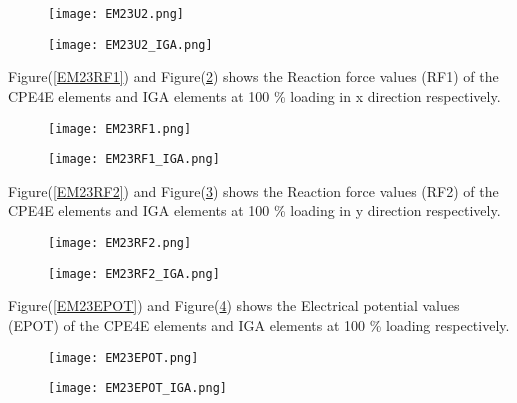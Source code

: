 \documentclass[11pt]{article}
\begin{document}
\begin{figure}[H]
	\centering
	\begin{minipage}{.5\textwidth}
		\centering
		\texttt{[image: EM23U2.png]}
		\label{EM23U2}
	\end{minipage}%
	\begin{minipage}{.5\textwidth}
		\centering
		\texttt{[image: EM23U2\_IGA.png]}
		\label{EM23U2_IGA}
	\end{minipage}
\end{figure}
Figure(\ref{EM23RF1}) and Figure(\ref{EM23RF1_IGA}) shows the Reaction force values (RF1) of the CPE4E elements and IGA elements at 100 \% loading in x direction respectively. \\
\begin{figure}[H]
	\centering
	\begin{minipage}{.5\textwidth}
		\centering
		\texttt{[image: EM23RF1.png]}
		\label{EM23RF1}
	\end{minipage}%
	\begin{minipage}{.5\textwidth}
		\centering
		\texttt{[image: EM23RF1\_IGA.png]}
		\label{EM23RF1_IGA}
	\end{minipage}
\end{figure}
Figure(\ref{EM23RF2}) and Figure(\ref{EM23RF2_IGA}) shows the Reaction force values (RF2) of the CPE4E elements and IGA elements at 100 \% loading in y direction respectively. \\
\begin{figure}[H]
	\centering
	\begin{minipage}{.5\textwidth}
		\centering
		\texttt{[image: EM23RF2.png]}
		\label{EM23RF2}
	\end{minipage}%
	\begin{minipage}{.5\textwidth}
		\centering
		\texttt{[image: EM23RF2\_IGA.png]}
		\label{EM23RF2_IGA}
	\end{minipage}
\end{figure}
Figure(\ref{EM23EPOT}) and Figure(\ref{EM23EPOT_IGA}) shows the Electrical potential values (EPOT) of the CPE4E elements and IGA elements at 100 \% loading respectively. \\
\begin{figure}[H]
	\centering
	\begin{minipage}{.5\textwidth}
		\centering
		\texttt{[image: EM23EPOT.png]}
		\label{EM23EPOT}
	\end{minipage}%
	\begin{minipage}{.5\textwidth}
		\centering
		\texttt{[image: EM23EPOT\_IGA.png]}
		\label{EM23EPOT_IGA}
	\end{minipage}
\end{figure}
\end{document}
